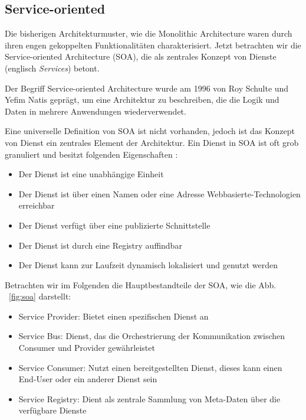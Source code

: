 \documentclass[acmtog]{acmart}
\begin{document}
\subsection{Service-oriented}
Die bisherigen Architekturmuster, wie die Monolithic Architecture waren
durch ihren engen gekoppelten Funktionalitäten charakterisiert.
Jetzt betrachten wir die Service-oriented Architecture (SOA), die als zentrales
Konzept von Dienste (englisch \textit{Services}) betont.

Der Begriff Service-oriented Architecture wurde am 1996 von Roy Schulte und Yefim Natis geprägt, um
 eine Architektur zu beschreiben, die die Logik und Daten in mehrere Anwendungen wiederverwendet.\cite[104]{soa3}

Eine universelle Definition von SOA ist nicht vorhanden, jedoch ist das Konzept
von Dienst ein zentrales Element der Architektur.
Ein Dienst in SOA ist oft grob granuliert und besitzt folgenden Eigenschaften \cite[16]{soa2}\cite[19]{soa4}:
\begin{itemize}
  \item Der Dienst ist eine unabhängige Einheit
  \item Der Dienst ist über einen Namen oder eine Adresse Webbasierte-Technologien erreichbar
  \item Der Dienst verfügt über eine publizierte Schnittstelle
  \item Der Dienst ist durch eine Registry auffindbar
  \item Der Dienst kann zur Laufzeit dynamisch lokalisiert und genutzt werden
\end{itemize}

 Betrachten wir im Folgenden die Hauptbestandteile der SOA, wie die Abb. ~\ref{fig:soa} \cite{soa4} darstellt:
\begin{itemize}
  \item Service Provider: Bietet einen spezifischen Dienst an
  \item Service Bus: Dienst, das die Orchestrierung der Kommunikation zwischen Consumer und Provider gewährleistet
  \item Service Consumer: Nutzt einen bereitgestellten Dienst, dieses kann einen End-User oder ein anderer Dienst sein
  \item Service Registry: Dient als zentrale Sammlung von Meta-Daten über die verfügbare Dienste
\end{itemize}
\end{document}
